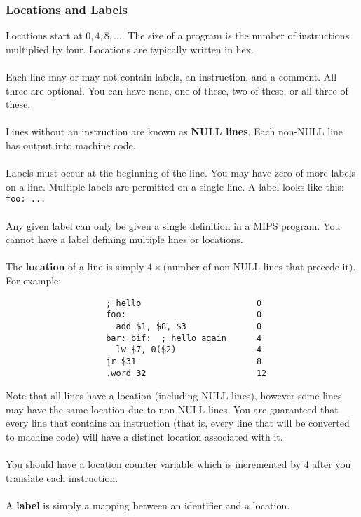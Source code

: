 \documentclass[]{article}
\theoremstyle{definition}
\begin{document}
			\subsubsection{Locations and Labels}
				Locations start at $0, 4, 8, \ldots$. The size of a program is the number of instructions multiplied by four. Locations are typically written in hex.
				\\ \\
				Each line may or may not contain labels, an instruction, and a comment. All three are optional. You can have none, one of these, two of these, or all three of these.
				\\ \\
				Lines without an instruction are known as \textbf{NULL lines}. Each non-NULL line has output into machine code.
				\\ \\
				Labels must occur at the beginning of the line. You may have zero of more labels on a line. Multiple labels are permitted on a single line. A label looks like this: \verb+foo: ...+
				\\ \\
				Any given label can only be given a single definition in a MIPS program. You cannot have a label defining multiple lines or locations.
				\\ \\
				The \textbf{location} of a line is simply $4 \times \text{(number of non-NULL lines that precede it)}$. For example:
				\begin{verbatim}
					; hello                       0
					foo:                          0
					  add $1, $8, $3              0
					bar: bif:  ; hello again      4
					  lw $7, 0($2)                4
					jr $31                        8
					.word 32                      12
				\end{verbatim}
				Note that all lines have a location (including NULL lines), however some lines may have the same location due to non-NULL lines. You are guaranteed that every line that contains an instruction (that is, every line that will be converted to machine code) will have a distinct location associated with it.
				\\ \\
				You should have a location counter variable which is incremented by 4 after you translate each instruction.
				\\ \\
				A \textbf{label} is simply a mapping between an identifier and a location.
\end{document}
